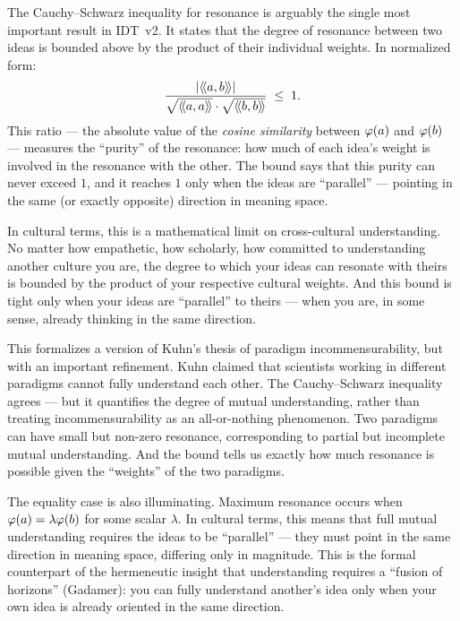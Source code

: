 \begin{interpretation}
\label{interp:cauchy-schwarz}
The Cauchy--Schwarz inequality for resonance is arguably the single most
important result in IDT~v2. It states that the degree of resonance between
two ideas is bounded above by the product of their individual weights. In
normalized form:
\[
  \frac{|\langle\!\langle a, b \rangle\!\rangle|}{\sqrt{\langle\!\langle a, a \rangle\!\rangle} \cdot \sqrt{\langle\!\langle b, b \rangle\!\rangle}} \;\leq\; 1.
\]
This ratio --- the absolute value of the \emph{cosine similarity} between
$\varphi(a)$ and $\varphi(b)$ --- measures the ``purity'' of the resonance:
how much of each idea's weight is involved in the resonance with the other.
The bound says that this purity can never exceed $1$, and it reaches $1$
only when the ideas are ``parallel'' --- pointing in the same (or exactly
opposite) direction in meaning space.

In cultural terms, this is a mathematical limit on cross-cultural understanding.
No matter how empathetic, how scholarly, how committed to understanding another
culture you are, the degree to which your ideas can resonate with theirs is
bounded by the product of your respective cultural weights. And this bound is
tight only when your ideas are ``parallel'' to theirs --- when you are, in some
sense, already thinking in the same direction.

This formalizes a version of Kuhn's thesis of paradigm incommensurability, but
with an important refinement. Kuhn claimed that scientists working in different
paradigms cannot fully understand each other. The Cauchy--Schwarz inequality
agrees --- but it quantifies the degree of mutual understanding, rather than
treating incommensurability as an all-or-nothing phenomenon. Two paradigms can
have small but non-zero resonance, corresponding to partial but incomplete
mutual understanding. And the bound tells us exactly how much resonance is
possible given the ``weights'' of the two paradigms.

The equality case is also illuminating. Maximum resonance occurs when
$\varphi(a) = \lambda \varphi(b)$ for some scalar $\lambda$. In cultural terms,
this means that full mutual understanding requires the ideas to be ``parallel''
--- they must point in the same direction in meaning space, differing only in
magnitude. This is the formal counterpart of the hermeneutic insight that
understanding requires a ``fusion of horizons'' (Gadamer): you can fully
understand another's idea only when your own idea is already oriented in the
same direction.
\end{interpretation}


